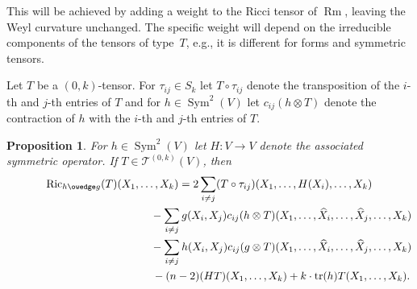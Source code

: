 \documentclass[pdftex]{sigma}
\numberwithin{equation}{section}
\newtheorem{Proposition}[Theorem]{Proposition}
{ \theoremstyle{definition}
\newtheorem{Remark}[Theorem]{Remark} }
\newcommand{\Ric} {\operatorname{Ric}}
\newcommand{ \tr } {\operatorname{tr}}
\newcommand{\Rm} {\operatorname{Rm}}
\newcommand{ \Sym } {\operatorname{Sym}}
\begin{document}
This will be achieved by adding a weight to the Ricci tensor of $\Rm$, leaving the Weyl curvature unchanged. The specific weight will depend on the irreducible components of the tensors of type~$T$, e.g., it is different for forms and symmetric tensors.

Let $T$ be a $(0,k)$-tensor. For $\tau_{ij} \in S_k$ let $T \circ \tau_{ij}$ denote the transposition of the $i$-th and $j$-th entries of $T$ and for $h \in \Sym^2(V)$ let $c_{ij}(h \otimes T)$ denote the contraction of $h$ with the $i$-th and $j$-th entries of $T$.

\begin{Proposition}\label{GeneralFormulaBochnerOnHWedgeG}
For $h \in \Sym^2(V)$ let $H \colon V \to V$ denote the associated symmetric operator. If $T \in \mathcal{T}^{(0,k)}(V)$, then
\begin{gather*}
\Ric_{h \owedge g}(T) (X_1, \dots, X_k)
=   2 \sum_{i \neq j} ( T \circ \tau_{ij}) (X_1, \dots, H(X_i), \dots, X_k) \\
\hphantom{\Ric_{h \owedge g}(T) (X_1, \dots, X_k)=}{}
 - \sum_{i \neq j} g(X_i, X_j) c_{ij}(h \otimes T)( X_1, \dots, \widehat{X}_i, \dots, \widehat{X}_j, \dots, X_k ) \\
\hphantom{\Ric_{h \owedge g}(T) (X_1, \dots, X_k)=}{} - \sum_{i \neq j} h(X_i, X_j) c_{ij}(g \otimes T)( X_1, \dots, \widehat{X}_i, \dots, \widehat{X}_j, \dots, X_k ) \\
\hphantom{\Ric_{h \owedge g}(T) (X_1, \dots, X_k)=}{} -(n-2) (HT)(X_1, \dots, X_k) + k \cdot \tr(h) T( X_1, \dots, X_k).
\end{gather*}
\end{Proposition}
\end{document}
